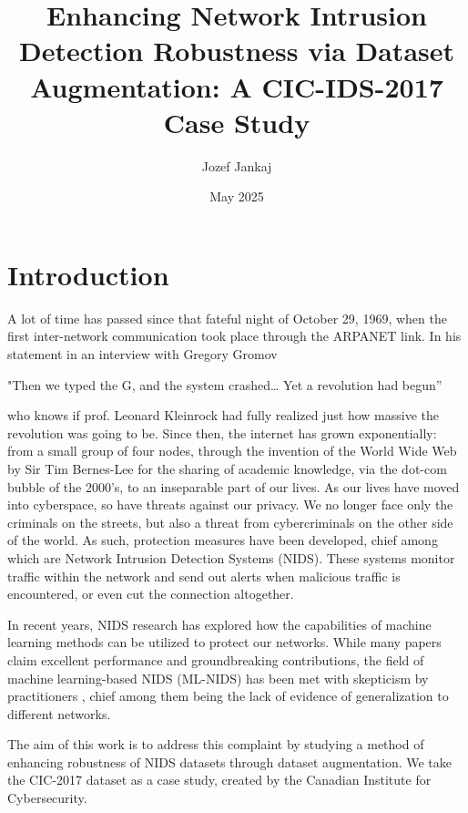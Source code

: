 \documentclass[english]{article}
\title{Enhancing Network Intrusion Detection Robustness via Dataset Augmentation: A CIC-IDS-2017 Case Study
}
\author{Jozef Jankaj}
\date{May 2025}
\begin{document}
	
	
	
	
	
	
	\tableofcontents
	
	\newpage
	\setcounter{page}{1}
	\section{Introduction}
	A lot of time has passed since that fateful night of October 29, 1969, when the first inter-network communication took place through the ARPANET link. In his statement in an interview with Gregory Gromov
	
	\begin{center} 
		"Then we typed the G, and the system crashed… Yet a revolution had begun” \cite{kleinrock}
	\end{center}
	
	who knows if prof. Leonard Kleinrock had fully realized just how massive the revolution was going to be. 
	Since then, the internet has grown exponentially: from a small group of four nodes, through the invention of the World Wide Web by Sir Tim Bernes-Lee for the sharing of academic knowledge, via the dot-com bubble of the 2000's, to an inseparable part of our lives. As our lives have moved into cyberspace, so have threats against our privacy. We no longer face only the criminals on the streets, but also a threat from cybercriminals on the other side of the world. As such, protection measures have been developed, chief among which are Network Intrusion Detection Systems (NIDS). These systems monitor traffic within the network and send out alerts when malicious traffic is encountered, or even cut the connection altogether. 
	
	In recent years, NIDS research has explored how the capabilities of machine learning methods can be utilized to protect our networks. While many papers claim excellent performance and groundbreaking contributions, the field of machine learning-based NIDS (ML-NIDS) has been met with skepticism by practitioners \cite{sok_nids_assessment}, chief among them being the lack of evidence of generalization to different networks.
	
	The aim of this work is to address this complaint by studying a method of enhancing robustness of NIDS datasets through dataset augmentation. We take the CIC-2017 dataset \cite{cic_2017} as a case study, created by the Canadian Institute for Cybersecurity. 
	
\end{document}
